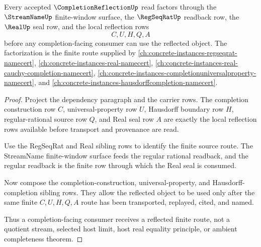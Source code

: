 \begin{theorem}
\label{thm:completion-reflection-stream-regseq-real-factor}
Every accepted $\CompletionReflectionUp$ read factors through the $\StreamNameUp$ finite-window surface, the $\RegSeqRatUp$ readback row, the $\RealUp$ seal row, and the local reflection rows
$$
C,U,H,Q,A
$$
before any completion-facing consumer can use the reflected object. The factorization is the finite route supplied by \autoref{ch:concrete-instances-regseqrat-namecert}, \autoref{ch:concrete-instances-real-namecert}, \autoref{ch:concrete-instances-real-cauchy-completion-namecert}, \autoref{ch:concrete-instances-completionuniversalproperty-namecert}, and \autoref{ch:concrete-instances-hausdorffcompletion-namecert}.
\end{theorem}
\begin{proof}
Project the dependency paragraph and the carrier rows. The completion construction row $C$, universal-property row $U$, Hausdorff boundary row $H$, regular-rational source row $Q$, and Real seal row $A$ are exactly the local reflection rows available before transport and provenance are read.

Use the RegSeqRat and Real sibling rows to identify the finite source route. The StreamName finite-window surface feeds the regular rational readback, and the regular readback is the finite row through which the Real seal is consumed.

Now compose the completion-construction, universal-property, and Hausdorff-completion sibling rows. They allow the reflected object to be used only after the same finite $C,U,H,Q,A$ route has been transported, replayed, cited, and named.

Thus a completion-facing consumer receives a reflected finite route, not a quotient stream, selected host limit, host real equality principle, or ambient completeness theorem.
\end{proof}

